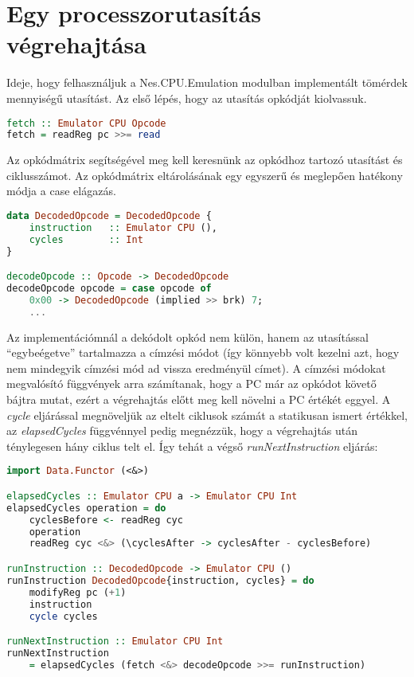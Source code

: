 \section{Egy processzorutasítás végrehajtása}
Ideje, hogy felhasználjuk a Nes.CPU.Emulation modulban implementált tömérdek mennyiségű utasítást. Az első lépés, hogy az utasítás opkódját kiolvassuk.
\vspace{0.3cm}
\begin{lstlisting}[language=Haskell, basicstyle=\scriptsize]
fetch :: Emulator CPU Opcode
fetch = readReg pc >>= read
\end{lstlisting}
\vspace{0.2cm}
Az opkódmátrix segítségével meg kell keresnünk az opkódhoz tartozó utasítást és ciklusszámot. Az opkódmátrix eltárolásának egy egyszerű és meglepően hatékony módja a case elágazás.
\vspace{0.2cm}
\begin{lstlisting}[language=Haskell, basicstyle=\scriptsize]
data DecodedOpcode = DecodedOpcode {
	instruction   :: Emulator CPU (),
	cycles        :: Int
}

decodeOpcode :: Opcode -> DecodedOpcode
decodeOpcode opcode = case opcode of
	0x00 -> DecodedOpcode (implied >> brk) 7;
	...
\end{lstlisting}
\vspace{0.3cm}
Az implementációmnál a dekódolt opkód nem külön, hanem az utasítással ``egybeégetve'' tartalmazza a címzési módot (így könnyebb volt kezelni azt, hogy nem mindegyik címzési mód ad vissza eredményül címet). A címzési módokat megvalósító függvények arra számítanak, hogy a PC már az opkódot követő bájtra mutat, ezért a végrehajtás előtt meg kell növelni a PC értékét eggyel.
A \emph{cycle} eljárással megnöveljük az eltelt ciklusok számát a statikusan ismert értékkel, az \emph{elapsedCycles} függvénnyel pedig megnézzük, hogy a végrehajtás után ténylegesen hány ciklus telt el.
Így tehát a végső \emph{runNextInstruction} eljárás:
\vspace{0.3cm}
\begin{lstlisting}[language=Haskell, basicstyle=\scriptsize]
import Data.Functor (<&>)

elapsedCycles :: Emulator CPU a -> Emulator CPU Int
elapsedCycles operation = do
	cyclesBefore <- readReg cyc
	operation
	readReg cyc <&> (\cyclesAfter -> cyclesAfter - cyclesBefore)

runInstruction :: DecodedOpcode -> Emulator CPU ()
runInstruction DecodedOpcode{instruction, cycles} = do
	modifyReg pc (+1)
	instruction
	cycle cycles

runNextInstruction :: Emulator CPU Int
runNextInstruction 
 	= elapsedCycles (fetch <&> decodeOpcode >>= runInstruction)
\end{lstlisting}

